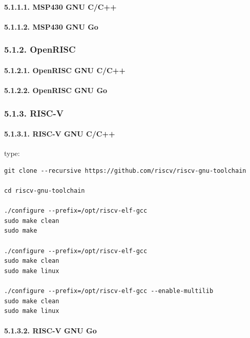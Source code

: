 \documentclass[]{article}
\let\oldparagraph\paragraph
\renewcommand{\paragraph}[1]{\oldparagraph{#1}\mbox{}}
\begin{document}
\paragraph{5.1.1.1. MSP430 GNU C/C++}\label{msp430-gnu-cc}

\paragraph{5.1.1.2. MSP430 GNU Go}\label{msp430-gnu-go}

\subsubsection{5.1.2. OpenRISC}\label{openrisc}

\paragraph{5.1.2.1. OpenRISC GNU C/C++}\label{openrisc-gnu-cc}

\paragraph{5.1.2.2. OpenRISC GNU Go}\label{openrisc-gnu-go}

\subsubsection{5.1.3. RISC-V}\label{risc-v}

\paragraph{5.1.3.1. RISC-V GNU C/C++}\label{risc-v-gnu-cc}

type:

\begin{verbatim}
git clone --recursive https://github.com/riscv/riscv-gnu-toolchain

cd riscv-gnu-toolchain

./configure --prefix=/opt/riscv-elf-gcc
sudo make clean
sudo make

./configure --prefix=/opt/riscv-elf-gcc
sudo make clean
sudo make linux

./configure --prefix=/opt/riscv-elf-gcc --enable-multilib
sudo make clean
sudo make linux
\end{verbatim}

\paragraph{5.1.3.2. RISC-V GNU Go}\label{risc-v-gnu-go}
\end{document}
